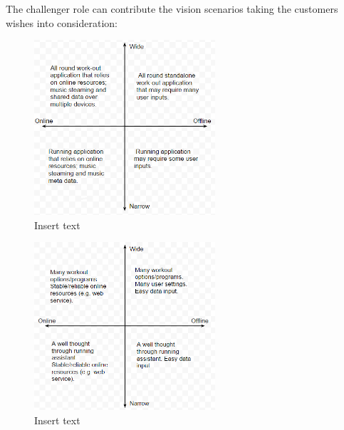 The challenger role can contribute the vision scenarios taking the customers wishes into consideration:


\begin{figure}[h!]
  \centering
    \includegraphics[width=0.6\textwidth]{Images/axis1.png}
    \caption{Insert text}
    \label{fig:axis1}
\end{figure}

\begin{figure}[h!]
  \centering
    \includegraphics[width=0.6\textwidth]{Images/axis2.png}
    \caption{Insert text}
    \label{fig:axis2}
\end{figure}
